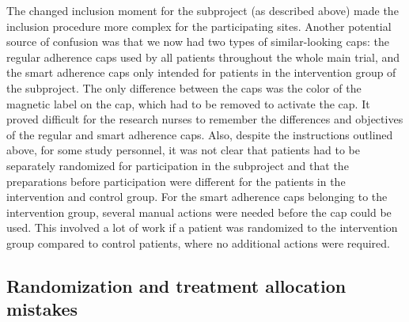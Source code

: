 \documentclass[twocolumn, serif, empirical, authordate]{jote-article}
\begin{document}
 The changed inclusion moment for the subproject (as described above)
made the inclusion procedure more complex for the participating sites.
 Another potential source of confusion was that we now had two types of similar-looking caps: the regular adherence caps used by all patients throughout the whole main trial, and the smart adherence caps only intended for patients in the intervention group of the subproject. The only difference between the caps was the color of the magnetic label on the cap, which had to be removed to activate the cap. It proved difficult for the research nurses to remember the differences and objectives of the regular and smart adherence caps.
 Also, despite the instructions outlined above, for some study personnel, it was not clear that patients had to be separately randomized for participation in the subproject and that the preparations before participation were different for the patients in the intervention and control group. For the smart adherence caps belonging to the intervention group, several manual actions were needed before the cap could be used. This involved a lot of work if a patient was randomized to the intervention group compared to control patients, where no additional actions were required.


\subsection*{Randomization and treatment allocation mistakes}
\end{document}
